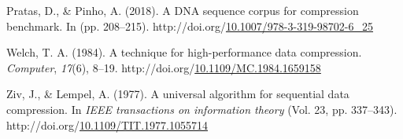 \documentclass[12pt,twoside]{reedthesis}
\newlength{\cslhangindent}
\newenvironment{CSLReferences}[2] %
 {%
  \setlength{\parindent}{0pt}
  \ifodd #1 \everypar{\setlength{\hangindent}{\cslhangindent}}\ignorespaces\fi
  \ifnum #2 > 0
  \setlength{\parskip}{#2\baselineskip}
  \fi
 }%
 {}
\begin{document}
\begin{CSLReferences}{1}{0}
\leavevmode{}%
Pratas, D., \& Pinho, A. (2018). A DNA sequence corpus for compression benchmark. In (pp. 208--215). http://doi.org/\href{https://doi.org/10.1007/978-3-319-98702-6_25}{10.1007/978-3-319-98702-6\_25}

\leavevmode{}%
Welch, T. A. (1984). A technique for high-performance data compression. \emph{Computer}, \emph{17}(6), 8--19. http://doi.org/\href{https://doi.org/10.1109/MC.1984.1659158}{10.1109/MC.1984.1659158}

\leavevmode{}%
Ziv, J., \& Lempel, A. (1977). A universal algorithm for sequential data compression. In \emph{IEEE transactions on information theory} (Vol. 23, pp. 337--343). http://doi.org/\href{https://doi.org/10.1109/TIT.1977.1055714}{10.1109/TIT.1977.1055714}

\end{CSLReferences}

\end{document}
